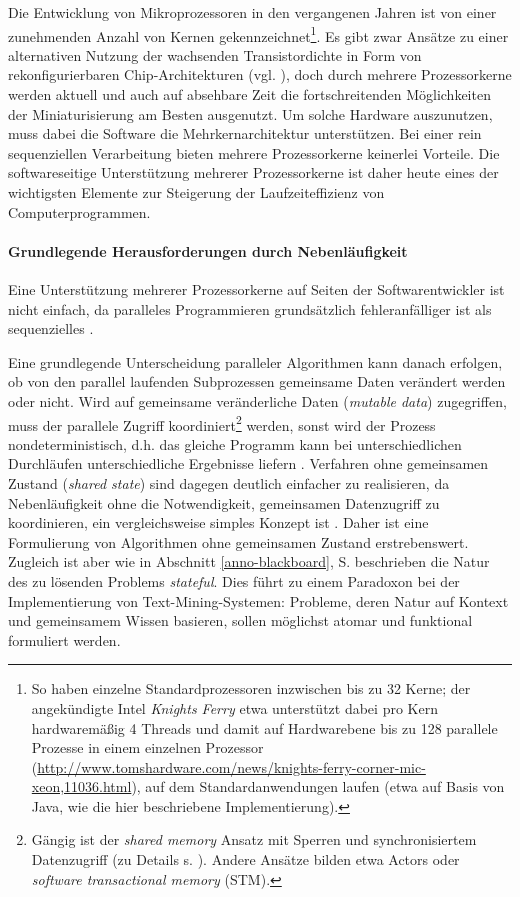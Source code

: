 \documentclass[abstracton, 12pt]{scrartcl}
\begin{document}
Die Entwicklung von Mikroprozessoren in den vergangenen Jahren ist von einer zunehmenden Anzahl von Kernen gekennzeichnet\footnote{So haben einzelne Standardprozessoren inzwischen bis zu 32 Kerne; der angekündigte Intel \emph{Knights Ferry} etwa unterstützt dabei pro Kern hardwaremäßig 4 Threads und damit auf Hardwarebene bis zu 128 parallele Prozesse in einem einzelnen Prozessor (\url{http://www.tomshardware.com/news/knights-ferry-corner-mic-xeon,11036.html}), auf dem Standardanwendungen laufen (etwa auf Basis von Java, wie die hier beschriebene Implementierung).}. Es gibt zwar Ansätze zu einer alternativen Nutzung der wachsenden Transistordichte in Form von rekonfigurierbaren Chip-Architekturen (vgl. \citealt{BerekovicAndHochberger2008}), doch durch mehrere Prozessorkerne werden aktuell und auch auf absehbare Zeit die fortschreitenden Möglichkeiten der Miniaturisierung am Besten ausgenutzt. Um solche Hardware auszunutzen, muss dabei die Software die Mehrkernarchitektur unterstützen. Bei einer rein sequenziellen Verarbeitung bieten mehrere Prozessorkerne keinerlei Vorteile. Die softwareseitige Unterstützung mehrerer Prozessorkerne ist daher heute eines der wichtigsten Elemente zur Steigerung der Laufzeiteffizienz von Computerprogrammen.

\paragraph{Grundlegende Herausforderungen durch Nebenläufigkeit}

Eine Unterstützung mehrerer Prozessorkerne auf Seiten der Softwarentwickler ist nicht einfach, da paralleles Programmieren grundsätzlich fehleranfälliger ist als sequenzielles \citep[1]{GoetzEtAl2006}.

Eine grundlegende Unterscheidung paralleler Algorithmen kann danach erfolgen, ob von den parallel laufenden Subprozessen gemeinsame Daten verändert werden oder nicht. Wird auf gemeinsame veränderliche Daten (\emph{mutable data}) zugegriffen, muss der parallele Zugriff koordiniert\footnote{Gängig ist der \emph{shared memory} Ansatz mit Sperren und synchronisiertem Datenzugriff (zu Details s. \citealt[405,569]{VanRoyAndHaridi2004}). Andere Ansätze bilden etwa Actors oder \emph{software transactional memory} (STM).} werden, sonst wird der Prozess nondeterministisch, d.h. das gleiche Programm kann bei unterschiedlichen Durchläufen unterschiedliche Ergebnisse liefern \citep[20]{VanRoyAndHaridi2004}. Verfahren ohne gemeinsamen Zustand (\emph{shared state}) sind dagegen deutlich einfacher zu realisieren, da Nebenläufigkeit ohne die Notwendigkeit, gemeinsamen Datenzugriff zu koordinieren, ein vergleichsweise simples Konzept ist \citep[14-5]{VanRoyAndHaridi2004}. Daher ist eine Formulierung von Algorithmen ohne gemeinsamen Zustand erstrebenswert. Zugleich ist aber wie in Abschnitt \ref{anno-blackboard}, S. \pageref{anno-blackboard} beschrieben die Natur des zu lösenden Problems \emph{stateful}. Dies führt zu einem Paradoxon bei der Implementierung von Text-Mining-Systemen: Probleme, deren Natur auf Kontext und gemeinsamem Wissen basieren, sollen möglichst atomar und funktional formuliert werden.
\end{document}
